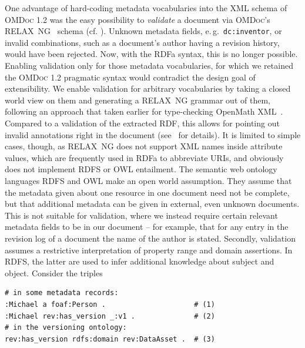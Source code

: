 \documentclass{llncs}
\renewcommand{\omdoc}{\textsc{OMDoc}\xspace}
\begin{document}
One advantage of hard-coding metadata vocabularies into the XML schema of {\omdoc} 1.2 was
the easy possibility to \emph{validate} a document via {\omdoc}'s
RELAX~NG~\cite{RelaxNGWeb} schema (cf. \cite[appendix D]{Kohlhase:omdoc1.2}).  Unknown
metadata fields, e.\,g.\ \texttt{dc:inventor}, or invalid combinations, such as a
document's author having a revision history, would have been rejected.  Now, with the RDFa
syntax, this is no longer possible.  Enabling validation only for those metadata
vocabularies, for which we retained the {\omdoc} 1.2 pragmatic syntax would contradict the
design goal of extensibility.  We enable validation for arbitrary vocabularies by taking a
closed world view on them and generating a RELAX~NG grammar out of them, following an
approach that taken earlier for type-checking OpenMath XML~\cite{Kohlhase:STS-RelaxNG08}.
Compared to a validation of the extracted RDF, this allows for pointing out invalid
annotations right in the document (see~\cite{LK:OMDocOntologyLanguage08} for details).  It
is limited to simple cases, though, as RELAX~NG does not support XML names inside
attribute values, which are frequently used in RDFa to abbreviate URIs, and obviously does
not implement RDFS or OWL entailment.  The semantic web ontology languages RDFS and OWL
make an open world assumption.  They assume that the metadata given about one resource in
one document need not be complete, but that additional metadata can be given in external,
even unknown documents.  This is not suitable for validation, where we instead require
certain relevant metadata fields to be in our document -- for example, that for any entry
in the revision log of a document the name of the author is stated.  Secondly, validation
assumes a restrictive interpretation of property range and domain assertions.  In RDFS,
the latter are used to infer additional knowledge about subject and object.  Consider the
triples

\begin{lstlisting}
# in some metadata records:
:Michael a foaf:Person .                     # (1)
:Michael rev:has_version _:v1 .              # (2)
# in the versioning ontology:
rev:has_version rdfs:domain rev:DataAsset .  # (3)
\end{lstlisting}
\end{document}
